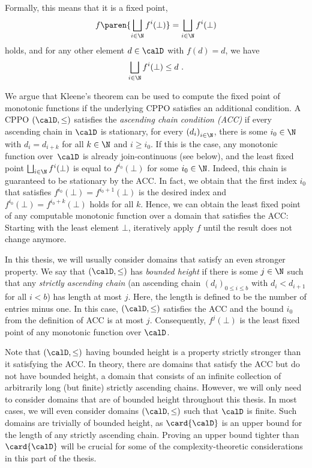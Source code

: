 \documentclass[../../diss.tex]{subfiles}
\begin{document}
Formally, this means that it is a fixed point, \ie
\[
    f \paren{ \bigsqcup_{i \in \N} f^i (\bot) } = \bigsqcup_{i \in \N} f^i (\bot)
\]
holds, and for any other element $d \in \domain$ with $f(d) = d$, we have
\[
    \bigsqcup_{i \in \N} f^i (\bot) \leq d
    \ .
\]

We argue that Kleene's theorem can be used to compute the fixed point of monotonic functions if the underlying CPPO satisfies an additional condition.
A CPPO $(\domain,\leq)$ satisfies the \emph{ascending chain condition (ACC)} if every ascending chain in $\domain$ is stationary, \ie for every ${(d_i)}_{i \in \N}$, there is some $i_0 \in \N$ with $d_i = d_{i + k}$ for all $k \in \N$ and $i \geq i_0$.
If this is the case, any monotonic function over~$\domain$ is already join-continuous (see below), and  the least fixed point
\(
    \bigsqcup_{i \in \N} f^i (\bot)
\)
is equal to $f^{i_0} (\bot)$ for some $i_0 \in \N$.
Indeed, this chain is guaranteed to be stationary by the ACC.\@
In fact, we obtain that the first index $i_0$ that satisfies $f^{i_0} (\bot) = f^{i_0 + 1}(\bot)$ is the desired index and $f^{i_0} (\bot) = f^{i_0 + k}(\bot)$ holds for all $k$.
Hence, we can obtain the least fixed point of any computable monotonic function over a domain that satisfies the ACC:\@
Starting with the least element $\bot$, iteratively apply $f$ until the result does not change anymore.

In this thesis, we will usually consider domains that satisfy an even stronger property.
We say that $(\domain,\leq)$ has \emph{bounded height} if there is some $j \in \N$ such that any \emph{strictly ascending chain} (an ascending chain ${(d_i)}_{0 \leq i \leq b}$ with $d_i < d_{i+1}$ for all $i < b$) has length at most $j$.
Here, the length is defined to be the number of entries minus one.
In this case, $(\domain,\leq)$ satisfies the ACC and the bound $i_0$ from the definition of ACC is at most $j$.
Consequently, $f^{j} (\bot)$ is the least fixed point of any monotonic function over $\domain$.

Note that $(\domain,\leq)$ having bounded height is a property strictly stronger than it satisfying the ACC.\@
In theory, there are domains that satisfy the ACC but do not have bounded height, \eg a domain that consists of an infinite collection of arbitrarily long (but finite) strictly ascending chains.
However, we will only need to consider domains that are of bounded height throughout this thesis.
In most cases, we will even consider domains $(\domain,\leq)$ such that $\domain$ is finite.
Such domains are trivially of bounded height, as $\card{\domain}$ is an upper bound for the length of any strictly ascending chain.
Proving an upper bound tighter than $\card{\domain}$ will be crucial for some of the complexity-theoretic considerations in this part of the thesis.
\end{document}
